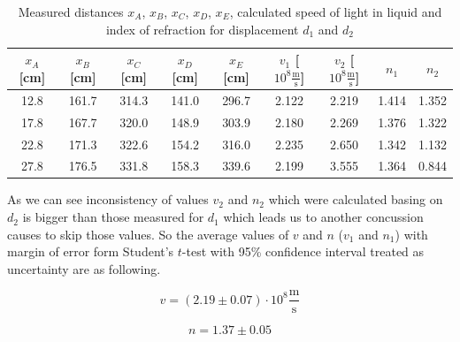 \documentclass[a4paper,12pt]{article}
\begin{document}
    \begin{table}[H]
        \begin{center}
            \caption{Measured distances $x_A$, $x_B$, $x_C$, $x_D$, $x_E$, calculated speed of light in liquid and index of refraction for displacement $d_1$ and $d_2$}
            \label{tab:vn}
            \begin{tabular}{|c|c|c|c|c|c|c|c|c|}
                \hline
                $x_A$ [cm] & $x_B$ [cm] & $x_C$ [cm] & 
                $x_D$ [cm] & $x_E$ [cm] & 
                $v_1$ [$10^8 \frac{\mathrm m}{\mathrm s}$] &
                $v_2$ [$10^8 \frac{\mathrm m}{\mathrm s}$] &
                $n_1$ & $n_2$ \\ 
                \hline
                12.8 & 161.7 & 314.3 & 141.0 & 296.7 & 2.122 & 2.219 & 1.414 & 1.352\\
                17.8 & 167.7 & 320.0 & 148.9 & 303.9 & 2.180 & 2.269 & 1.376 & 1.322\\
                22.8 & 171.3 & 322.6 & 154.2 & 316.0 & 2.235 & 2.650 & 1.342 & 1.132\\
                27.8 & 176.5 & 331.8 & 158.3 & 339.6 & 2.199 & 3.555 & 1.364 & 0.844\\
                \hline
            \end{tabular}
        \end{center}
    \end{table}

    As we can see inconsistency of values $v_2$ and $n_2$ which were calculated basing on $d_2$ is bigger than those measured for $d_1$ which leads us to another concussion causes to skip those values. So the average values of $v$ and $n$ ($v_1$ and $n_1$) with margin of error form Student's $t$-test with 95\% confidence interval treated as uncertainty are as following. 

    \begin{displaymath}
        v = (2.19 \pm 0.07) \cdot 10^8 \frac{\mathrm m}{\mathrm s}
    \end{displaymath}
    
    \begin{displaymath}
        n = 1.37 \pm 0.05
    \end{displaymath}
\end{document}
